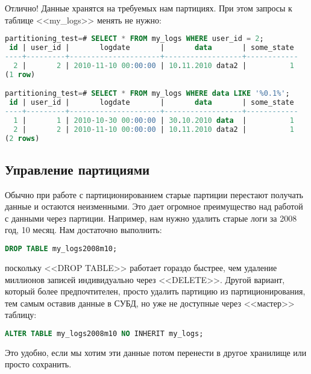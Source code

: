 Отлично! Данные хранятся на требуемых нам партициях. При этом запросы к таблице <<my\_logs>> менять не нужно:
\begin{lstlisting}[language=SQL,label=lst:partitioning11,caption=Проверка запросов]
partitioning_test=# SELECT * FROM my_logs WHERE user_id = 2;
 id | user_id |       logdate       |       data       | some_state
----+---------+---------------------+------------------+------------
  2 |       2 | 2010-11-10 00:00:00 | 10.11.2010 data2 |          1
(1 row)

partitioning_test=# SELECT * FROM my_logs WHERE data LIKE '%0.1%';
 id | user_id |       logdate       |       data       | some_state
----+---------+---------------------+------------------+------------
  1 |       1 | 2010-10-30 00:00:00 | 30.10.2010 data  |          1
  2 |       2 | 2010-11-10 00:00:00 | 10.11.2010 data2 |          1
(2 rows)
\end{lstlisting}

\subsection{Управление партициями}
Обычно при работе с партиционированием старые партиции перестают получать данные и остаются неизменными.
Это дает огромное преимущество над работой с данными через партиции. Например, нам нужно удалить старые логи за 2008 год, 10 месяц. Нам достаточно выполнить:
\begin{lstlisting}[language=SQL,label=lst:partitioning12,caption=Чистка логов]
DROP TABLE my_logs2008m10;
\end{lstlisting}
поскольку <<DROP TABLE>> работает гораздо быстрее, чем удаление миллионов записей индивидуально через <<DELETE>>.
Другой вариант, который более предпочтителен, просто удалить партицию из партиционирования,
тем самым оставив данные в СУБД, но уже не доступные через <<мастер>> таблицу:
\begin{lstlisting}[language=SQL,label=lst:partitioning13,caption=Удаляем партицию из партиционирования]
ALTER TABLE my_logs2008m10 NO INHERIT my_logs;
\end{lstlisting}
Это удобно, если мы хотим эти данные потом перенести в другое хранилище или просто сохранить.

